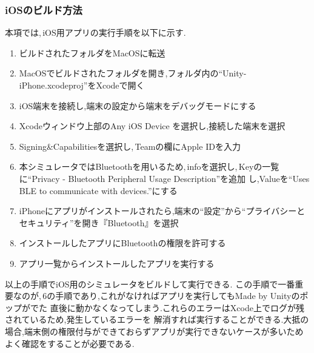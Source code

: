 \documentclass{ltjsreport}
\begin{document}
			\subsubsection{iOSのビルド方法}
				本項では,\,iOS用アプリの実行手順を以下に示す.
				\begin{enumerate}
					\item ビルドされたフォルダをMacOSに転送
					\item MacOSでビルドされたフォルダを開き,フォルダ内の``Unity-iPhone.xcodeproj''をXcodeで開く
					\item iOS端末を接続し,端末の設定から端末をデバッグモードにする
					\item Xcodeウィンドウ上部のAny iOS Device を選択し,接続した端末を選択
					\item Signing\&Capabilitiesを選択し,\,Teamの欄にApple IDを入力
					\item 本シミュレータではBluetoothを用いるため,\,infoを選択し,\,Keyの一覧に``Privacy - Bluetooth Peripheral Usage Description''を追加
						し,Valueを``Uses BLE to communicate with devices.''にする
					\item iPhoneにアプリがインストールされたら,端末の``設定''から``プライバシーとセキュリティ''を開き『Bluetooth』を選択
					\item インストールしたアプリにBluetoothの権限を許可する
					\item アプリ一覧からインストールしたアプリを実行する
				\end{enumerate}
				以上の手順でiOS用のシミュレータをビルドして実行できる.
				この手順で一番重要なのが,\,6の手順であり,これがなければアプリを実行してもMade by Unityのポップがでた
				直後に動かなくなってしまう.これらのエラーはXcode上でログが残されているため,発生しているエラーを
				解消すれば実行することができる.大抵の場合,端末側の権限付与ができておらずアプリが実行できないケースが多いため
				よく確認をすることが必要である.

\clearpage
\end{document}

